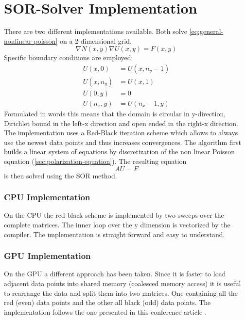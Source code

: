 \documentclass[master.tex]{subfiles}
\begin{document}
\section{SOR-Solver Implementation}
\label{sec:sor-solver-implementation}
There are two different implementations available. Both solve \autoref{eq:general-nonlinear-poisson} on a 2-dimensional grid.
\begin{equation}
    \nabla N(x,y)\nabla U(x,y) = F(x,y)\label{eq:general-nonlinear-poisson}
\end{equation}
Specific boundary conditions are employed:
\begin{equation}
    \begin{split}
        U(x, 0) &= U(x, n_y - 1) \\
        U(x, n_y) &= U(x, 1)\\
        U(0, y) &= 0\\
        U(n_x, y) &= U(n_x - 1, y)
    \end{split}
\end{equation}
Formulated in words this means that the domain is circular in y-direction, Dirichlet bound in the left-x direction and open ended in the right-x direction.
The implementation uses a Red-Black iteration scheme which allows to always use the newest data points and thus increases convergences. The algorithm first builds a linear system of equations by discretization of the non linear Poisson equation (\autoref{sec:polarization-equation}). The resulting equation
\begin{equation*}
    AU = F
\end{equation*}
is then solved using the \ac{SOR} \cite{SORPaper} method.

\subsubsection{CPU Implementation}
On the CPU the red black scheme is implemented by two sweeps over the complete matrices. The inner loop over the y dimension is vectorized by the compiler. The implementation is straight forward and easy to understand.

\subsubsection{GPU Implementation}
On the GPU a different approach has been taken. Since it is faster to load adjacent data points into shared memory (coalesced memory access) it is useful to rearrange the data and split them into two matrices. One containing all the red (even) data points and the other all black (odd) data points. The implementation follows the one presented in this conference article \cite{CUDARedBlack}.
\end{document}

